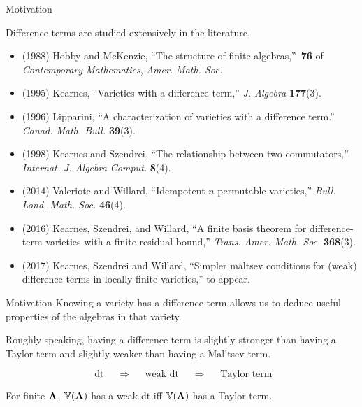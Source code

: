 \documentclass[notes=hide,12pt,xcolor=dvipsnames%
   ]{beamer}
\theoremstyle{definition}
\begin{document}
\begin{frame}[label=motivation-lit]{Motivation}

  Difference terms are studied extensively in the literature.

\begin{itemize}


\item
  {\footnotesize (1988)
    Hobby and McKenzie, ``The structure of finite algebras,''~{\bf 76} of
    {\em Contemporary Mathematics}, {\em Amer. Math. Soc.} }
\item
  {\footnotesize (1995) 
    Kearnes, ``Varieties with a difference term,'' 
    {\em J. Algebra} {\bf 177}(3).}
\item
  {\footnotesize (1996)
    Lipparini, ``A characterization of varieties with a difference term.''
    {\em Canad. Math. Bull.} {\bf 39}(3).}
\item
  {\footnotesize (1998)
    Kearnes and Szendrei, ``The relationship between two commutators,''
    {\em Internat. J. Algebra Comput.} {\bf 8}(4). } 
\item
  {\footnotesize (2014)
    Valeriote and Willard, ``Idempotent {$n$}-permutable varieties,'' 
    {\em Bull. Lond. Math. Soc.} {\bf 46}(4).}
\item
  {\footnotesize (2016)
    Kearnes, Szendrei, and Willard, ``A finite basis theorem for
    difference-term varieties with a finite residual bound,'' 
    {\em Trans. Amer. Math. Soc.} {\bf 368}(3).}
\item
  {\footnotesize (2017)
  Kearnes, Szendrei and Willard, ``Simpler maltsev conditions for (weak)
  difference terms in locally finite varieties,'' to appear.}
\end{itemize}
\end{frame}


\begin{frame}[label=motivation-heuristics]{Motivation}
  Knowing a variety has a difference term allows us to deduce useful
  properties of the algebras in that variety.

  Roughly speaking, having a difference term is slightly stronger than having
  a Taylor term and slightly weaker than having a Mal'tsev term.

  \[
  \text{ dt } \quad \Rightarrow \quad \text{ weak dt } \quad \Rightarrow \quad \text{ Taylor term}\]
  
  For finite $\mathbf{A}$, $\operatorname{\mathbb{V}}(\mathbf{A})$ has a weak dt iff
  $\operatorname{\mathbb{V}}(\mathbf{A})$ has a Taylor term.
\end{frame}
\end{document}
